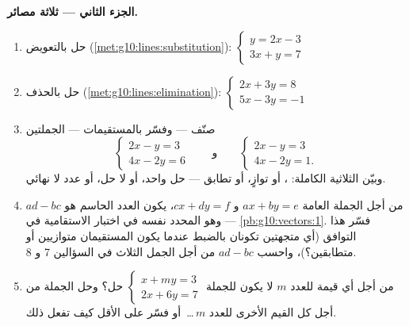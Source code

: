 \begin{problem}
\medskip
\noindent\textbf{الجزء الثاني --- ثلاثة مصائر.}
\begin{enumerate}[resume]
  \item حل بالتعويض
        (\cref{met:g10:lines:substitution}):
        $\begin{cases} y = 2x - 3 \\ 3x + y = 7 \end{cases}$
  \item حل بالحذف
        (\cref{met:g10:lines:elimination}):
        $\begin{cases} 2x + 3y = 8 \\ 5x - 3y = -1 \end{cases}$
  \item صنّف --- وفسّر بالمستقيمات --- الجملتين
        \[
        \begin{cases} 2x - y = 3 \\ 4x - 2y = 6 \end{cases}
        \qquad\text{و}\qquad
        \begin{cases} 2x - y = 3 \\ 4x - 2y = 1 . \end{cases}
        \]
        وبيّن الثلاثية الكاملة: ، أو توازٍ، أو
        تطابق --- حل واحد، أو لا حل، أو عدد لا نهائي.
  \item من أجل الجملة العامة $ax + by = e$ و $cx + dy = f$،
        يكون العدد الحاسم هو $ad - bc$ --- وهو المحدد
        نفسه في اختبار الاستقامية في
        \cref{pb:g10:vectors:1}. فسّر هذا التوافق (أي
        متجهتين تكونان  بالضبط عندما يكون المستقيمان
        متوازيين أو متطابقين؟)، واحسب $ad - bc$ من أجل
        الجمل الثلاث في السؤالين 7 و 8.
  \item من أجل أي قيمة للعدد $m$ لا يكون للجملة
        $\begin{cases} x + my = 3 \\ 2x + 6y = 7 \end{cases}$
        حل؟ وحل الجملة من أجل كل القيم الأخرى
        للعدد $m$\,\dots\ أو فسّر على الأقل كيف تفعل ذلك.
\end{enumerate}


\end{problem}
